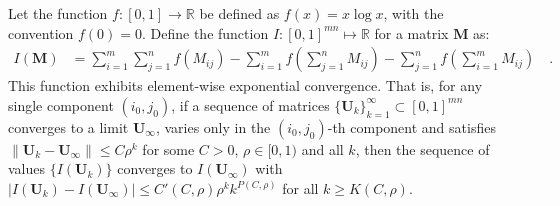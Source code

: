 \documentclass[../../main.tex]{subfiles}
\begin{document}
\begin{theorem}
Let the function $f: [0, 1] \to \mathbb{R}$ be defined as $f(x) = x \log x$, with the convention $f(0) = 0$. Define the function $I: [0, 1]^{mn} \mapsto \mathbb{R}$ for a matrix $\bm{M}$ as:
\begin{align*}
    I(\bm{M}) &= \sum_{i=1}^m \sum_{j=1}^n f(M_{ij}) - \sum_{i=1}^m f\left(\sum_{j=1}^n M_{ij}\right) - \sum_{j=1}^n f\left(\sum_{i=1}^m M_{ij}\right) \quad .
\end{align*}
This function exhibits element-wise exponential convergence. That is, for any single component $(i_0, j_0)$, if a sequence of matrices $\{\bm{U}_k\}_{k=1}^\infty \subset [0, 1]^{mn}$ converges to a limit $\bm{U}_\infty$, varies only in the $(i_0, j_0)$-th component and satisfies $\|\bm{U}_k - \bm{U}_\infty\| \leq C \rho^k$ for some $C > 0$, $\rho \in [0, 1)$ and all $k$, then the sequence of values $\{I(\bm{U}_k)\}$ converges to $I(\bm{U}_\infty)$ with $|I(\bm{U}_k) - I(\bm{U}_\infty)| \leq C'(C, \rho) \rho^k k^{P(C, \rho)}$ for all $k \geq K(C, \rho)$.
\end{theorem}
\pagebreak
\end{document}
